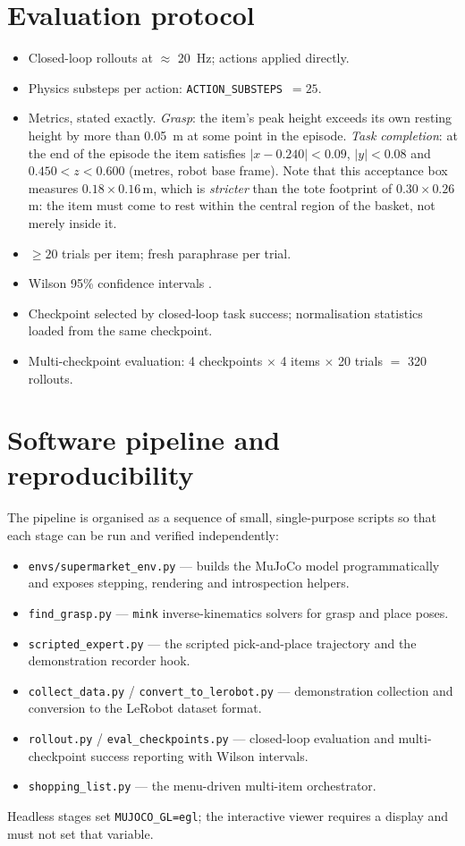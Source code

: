 \section{Evaluation protocol}
\begin{itemize}
    \item Closed-loop rollouts at $\approx$ 20~Hz; actions applied directly.
    \item Physics substeps per action: \texttt{ACTION\_SUBSTEPS}~$=25$.
    \item Metrics, stated exactly. \emph{Grasp}: the item's peak height exceeds its
    own resting height by more than \SI{0.05}{m} at some point in the episode.
    \emph{Task completion}: at the end of the episode the item satisfies
    $|x-0.240|<0.09$, $|y|<0.08$ and $0.450<z<0.600$ (metres, robot base frame).
    Note that this acceptance box measures $0.18\times0.16$\,\si{m}, which is
    \emph{stricter} than the tote footprint of $0.30\times0.26$\,\si{m}: the item must
    come to rest within the central region of the basket, not merely inside it.
    \item $\geq 20$ trials per item; fresh paraphrase per trial.
    \item Wilson 95\% confidence intervals \parencite{wilson1927ci}.
    \item Checkpoint selected by closed-loop task success; normalisation statistics
    loaded from the same checkpoint.
    \item Multi-checkpoint evaluation: 4 checkpoints $\times$ 4 items $\times$ 20
    trials $=$ 320 rollouts.
\end{itemize}

\section{Software pipeline and reproducibility}
The pipeline is organised as a sequence of small, single-purpose scripts so that each
stage can be run and verified independently:
\begin{itemize}
    \item \texttt{envs/supermarket\_env.py} --- builds the MuJoCo model
    programmatically and exposes stepping, rendering and introspection helpers.
    \item \texttt{find\_grasp.py} --- \texttt{mink} inverse-kinematics solvers for grasp
    and place poses.
    \item \texttt{scripted\_expert.py} --- the scripted pick-and-place trajectory and
    the demonstration recorder hook.
    \item \texttt{collect\_data.py} / \texttt{convert\_to\_lerobot.py} --- demonstration
    collection and conversion to the LeRobot dataset format.
    \item \texttt{rollout.py} / \texttt{eval\_checkpoints.py} --- closed-loop evaluation
    and multi-checkpoint success reporting with Wilson intervals.
    \item \texttt{shopping\_list.py} --- the menu-driven multi-item orchestrator.
\end{itemize}
Headless stages set \texttt{MUJOCO\_GL=egl}; the interactive viewer requires a display
and must not set that variable.

